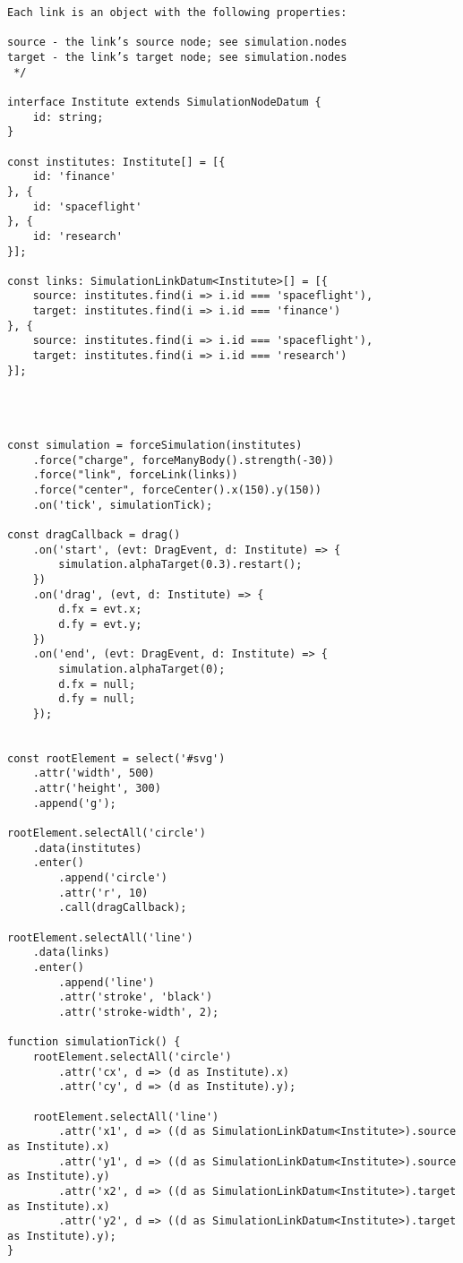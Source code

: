 {\begin{lstlisting}
Each link is an object with the following properties:

source - the link’s source node; see simulation.nodes
target - the link’s target node; see simulation.nodes
 */

interface Institute extends SimulationNodeDatum {
    id: string;
}

const institutes: Institute[] = [{
    id: 'finance'
}, {
    id: 'spaceflight'
}, {
    id: 'research'
}];

const links: SimulationLinkDatum<Institute>[] = [{
    source: institutes.find(i => i.id === 'spaceflight'),
    target: institutes.find(i => i.id === 'finance')
}, {
    source: institutes.find(i => i.id === 'spaceflight'),
    target: institutes.find(i => i.id === 'research')
}];




const simulation = forceSimulation(institutes)
    .force("charge", forceManyBody().strength(-30))
    .force("link", forceLink(links))
    .force("center", forceCenter().x(150).y(150))
    .on('tick', simulationTick);

const dragCallback = drag()
    .on('start', (evt: DragEvent, d: Institute) => {
        simulation.alphaTarget(0.3).restart(); 
    })
    .on('drag', (evt, d: Institute) => {
        d.fx = evt.x;
        d.fy = evt.y;
    })
    .on('end', (evt: DragEvent, d: Institute) => {
        simulation.alphaTarget(0);
        d.fx = null;
        d.fy = null;
    });


const rootElement = select('#svg')
    .attr('width', 500)
    .attr('height', 300)
    .append('g');

rootElement.selectAll('circle')
    .data(institutes)
    .enter()
        .append('circle')
        .attr('r', 10)
        .call(dragCallback);

rootElement.selectAll('line')
    .data(links)
    .enter()
        .append('line')
        .attr('stroke', 'black')
        .attr('stroke-width', 2);

function simulationTick() {
    rootElement.selectAll('circle')
        .attr('cx', d => (d as Institute).x)
        .attr('cy', d => (d as Institute).y);

    rootElement.selectAll('line')
        .attr('x1', d => ((d as SimulationLinkDatum<Institute>).source as Institute).x)
        .attr('y1', d => ((d as SimulationLinkDatum<Institute>).source as Institute).y)
        .attr('x2', d => ((d as SimulationLinkDatum<Institute>).target as Institute).x)
        .attr('y2', d => ((d as SimulationLinkDatum<Institute>).target as Institute).y);
}
\end{lstlisting}


}

